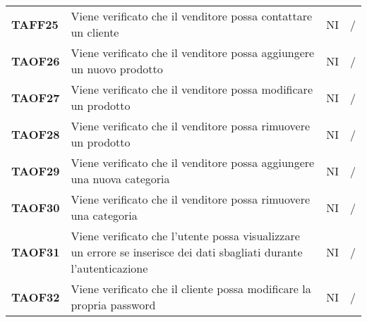 \begin{center}
\begin{longtable}[!h]{p{60px} p{240px} p{35px} p{35px}}
        \textbf{TAFF25} & Viene verificato che il venditore possa contattare un cliente                                                        & NI             & /              \\
        \textbf{TAOF26} & Viene verificato che il venditore possa aggiungere un nuovo prodotto                                                 & NI             & /              \\
        \textbf{TAOF27} & Viene verificato che il venditore possa modificare un prodotto                                                       & NI             & /              \\
        \textbf{TAOF28} & Viene verificato che il venditore possa rimuovere un prodotto                                                        & NI             & /              \\
        \textbf{TAOF29} & Viene verificato che il venditore possa aggiungere una nuova categoria                                               & NI             & /              \\
        \textbf{TAOF30} & Viene verificato che il venditore possa rimuovere una categoria                                                      & NI             & /              \\
        \textbf{TAOF31} & Viene verificato che l'utente possa visualizzare un errore se inserisce dei dati sbagliati durante l'autenticazione  & NI             & /              \\
        \textbf{TAOF32} & Viene verificato che il cliente possa modificare la propria password                                                 & NI             & /              \\
    \end{longtable}
\end{center}